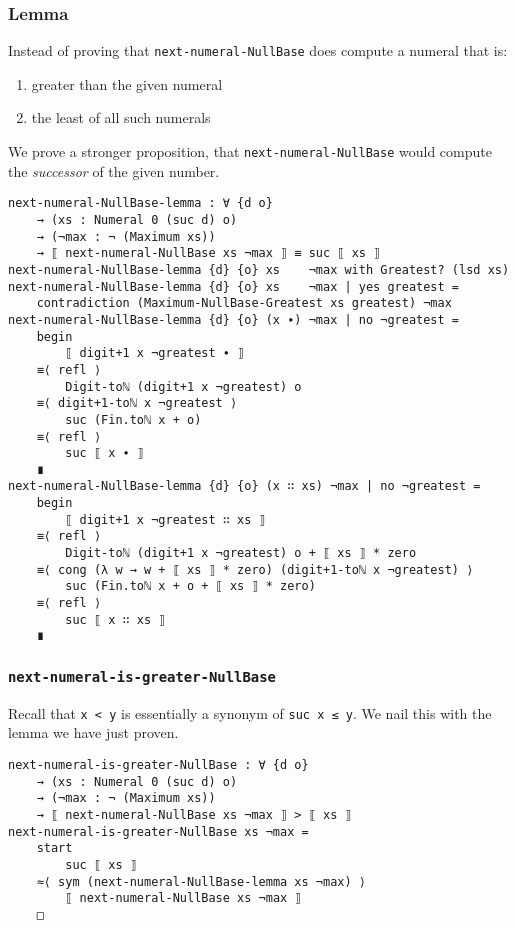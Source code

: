 \documentclass[\main/thesis.tex]{subfiles}
\begin{document}
\subsubsection{Lemma}

Instead of proving that {\lstinline|next-numeral-NullBase|} does compute a numeral
that is:
\begin{enumerate}
    \item greater than the given numeral
    \item the least of all such numerals
\end{enumerate}

We prove a stronger proposition, that {\lstinline|next-numeral-NullBase|} would
compute the \textit{successor} of the given number.

\begin{lstlisting}[basicstyle=\ttfamily\scriptsize]
next-numeral-NullBase-lemma : ∀ {d o}
    → (xs : Numeral 0 (suc d) o)
    → (¬max : ¬ (Maximum xs))
    → ⟦ next-numeral-NullBase xs ¬max ⟧ ≡ suc ⟦ xs ⟧
next-numeral-NullBase-lemma {d} {o} xs    ¬max with Greatest? (lsd xs)
next-numeral-NullBase-lemma {d} {o} xs    ¬max | yes greatest =
    contradiction (Maximum-NullBase-Greatest xs greatest) ¬max
next-numeral-NullBase-lemma {d} {o} (x ∙) ¬max | no ¬greatest =
    begin
        ⟦ digit+1 x ¬greatest ∙ ⟧
    ≡⟨ refl ⟩
        Digit-toℕ (digit+1 x ¬greatest) o
    ≡⟨ digit+1-toℕ x ¬greatest ⟩
        suc (Fin.toℕ x + o)
    ≡⟨ refl ⟩
        suc ⟦ x ∙ ⟧
    ∎
next-numeral-NullBase-lemma {d} {o} (x ∷ xs) ¬max | no ¬greatest =
    begin
        ⟦ digit+1 x ¬greatest ∷ xs ⟧
    ≡⟨ refl ⟩
        Digit-toℕ (digit+1 x ¬greatest) o + ⟦ xs ⟧ * zero
    ≡⟨ cong (λ w → w + ⟦ xs ⟧ * zero) (digit+1-toℕ x ¬greatest) ⟩
        suc (Fin.toℕ x + o + ⟦ xs ⟧ * zero)
    ≡⟨ refl ⟩
        suc ⟦ x ∷ xs ⟧
    ∎
\end{lstlisting}

\subsubsection{{\lstinline|next-numeral-is-greater-NullBase|}}

Recall that {\lstinline|x < y|} is essentially a synonym of {\lstinline|suc x ≤ y|}.
We nail this with the lemma we have just proven.

\begin{lstlisting}
next-numeral-is-greater-NullBase : ∀ {d o}
    → (xs : Numeral 0 (suc d) o)
    → (¬max : ¬ (Maximum xs))
    → ⟦ next-numeral-NullBase xs ¬max ⟧ > ⟦ xs ⟧
next-numeral-is-greater-NullBase xs ¬max =
    start
        suc ⟦ xs ⟧
    ≈⟨ sym (next-numeral-NullBase-lemma xs ¬max) ⟩
        ⟦ next-numeral-NullBase xs ¬max ⟧
    □
\end{lstlisting}
\end{document}
